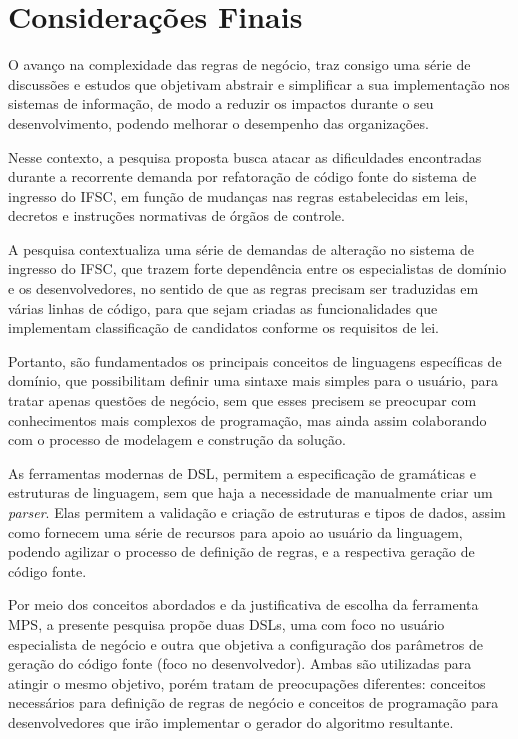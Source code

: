 \chapter{Considerações Finais}
\label{chap:consideracoes}



O avanço na complexidade das regras de negócio, traz consigo uma série de discussões e estudos que objetivam abstrair e simplificar a sua implementação nos sistemas de informação, de modo a reduzir os impactos durante o seu desenvolvimento, podendo melhorar o desempenho das organizações.   

Nesse contexto, a pesquisa proposta busca atacar as dificuldades encontradas durante a recorrente demanda por refatoração de código fonte do sistema de ingresso do \gls{IFSC}, em função de mudanças nas regras estabelecidas em leis, decretos e instruções normativas de órgãos de controle.

A pesquisa contextualiza uma série de demandas de alteração no sistema de ingresso do \gls{IFSC}, que trazem forte dependência entre os especialistas de domínio e os desenvolvedores, no sentido de que as regras precisam ser traduzidas em várias linhas de código, para que sejam criadas as funcionalidades que implementam classificação de candidatos conforme os requisitos de lei.

Portanto, são fundamentados os principais conceitos de linguagens específicas de domínio, que possibilitam definir uma sintaxe mais simples para o usuário, para tratar apenas questões de negócio, sem que esses precisem se preocupar com conhecimentos mais complexos de programação, mas ainda assim colaborando com o processo de modelagem e construção da solução.

As ferramentas modernas de \gls{DSL}, permitem a especificação de gramáticas e estruturas de linguagem, sem que haja a necessidade de manualmente criar um \textit{parser}. Elas permitem a validação e criação de estruturas e tipos de dados, assim como fornecem uma série de recursos para apoio ao usuário da linguagem, podendo agilizar o processo de definição de regras, e a respectiva geração de código fonte.

Por meio dos conceitos abordados e da justificativa de escolha da ferramenta \gls{MPS}, a presente pesquisa propõe duas \gls{DSL}s, uma com foco no usuário especialista de negócio e outra que objetiva a configuração dos parâmetros de geração do código fonte (foco no desenvolvedor). Ambas são utilizadas para atingir o mesmo objetivo, porém tratam de preocupações diferentes: conceitos necessários para definição de regras de negócio e conceitos de programação para desenvolvedores que irão implementar o gerador do algoritmo resultante.


